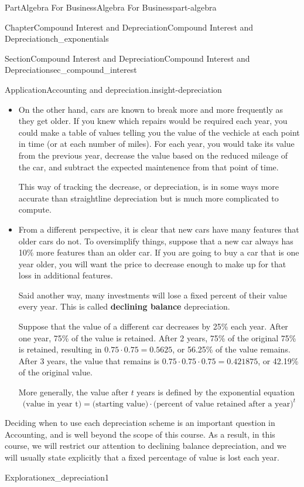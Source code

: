 \documentclass{tufte-book}
\newcommand{\terminology}[1]{\textbf{#1}}
\numberwithin{equation}{chapter}
\begin{document}
\begin{partptx}{Part}{Algebra For Business}{}{Algebra For Business}{}{}{part-algebra}
\begin{chapterptx}{Chapter}{Compound Interest and Depreciation}{}{Compound Interest and Depreciation}{}{}{ch_exponentials}
\begin{sectionptx}{Section}{Compound Interest and Depreciation}{}{Compound Interest and Depreciation}{}{}{sec_compound_interest}
\begin{insight}{Application}{Accounting and depreciation.}{insight-depreciation}
\begin{itemize}[label=\textbullet]
%
\item{}On the other hand, cars are known to break more and more frequently as they get older.  If you knew which repairs would be required each year, you could make a table of values telling you the value of the vechicle at each point in time (or at each number of miles).  For each year, you would take its value from the previous year, decrease the value based on the reduced mileage of the car, and subtract the expected maintenence from that point of time.%
\par
This way of tracking the decrease, or depreciation, is in some ways more accurate than straightline depreciation but is much more complicated to compute.%
\item{}From a different perspective, it is clear that new cars have many features that older cars do not.  To oversimplify things, suppose  that a new car always has 10\% more features than an older car.  If you are going to buy a car that is one year older, you will want the price to decrease enough to make up for that loss in additional features.%
\par
Said another way, many investments will lose a fixed percent of their value every year.  This is called \terminology{declining balance} depreciation.%
\par
Suppose that the value of a different car decreases by 25\% each year.  After one year, 75\% of the value is retained.  After 2 years, 75\% of the original 75\% is retained, resulting in \(0.75\cdot 0.75= 0.5625\), or 56.25\% of the value remains.  After 3 years, the value that remains is  \(0.75\cdot 0.75\cdot 0.75= 0.421875\), or 42.19\% of the original value.%
\par
More generally, the value after \(t\) years is defined by the exponential equation%
\begin{equation*}
\text{(value in year t)} = \text{(starting value)}\cdot \text{(percent of value retained after a year)}^t
\end{equation*}
%
\end{itemize}
%
\par
Deciding when to use each depreciation scheme is an important question in Accounting, and is well beyond the scope of this course. As a result, in this course, we will restrict our attention to declining balance depreciation, and we will usually state explicitly that a fixed percentage of value is lost each year.%
\end{insight}
\begin{exploration}{Exploration}{}{ex_depreciation1}%

\end{exploration}
\end{sectionptx}
\end{chapterptx}
\end{partptx}
\end{document}
